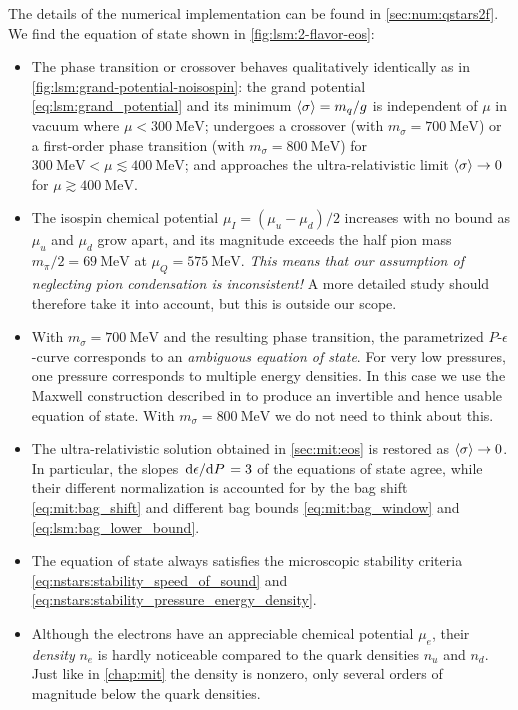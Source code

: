 \pagebreak
The details of the numerical implementation can be found in \cref{sec:num:qstars2f}.
We find the equation of state shown in \cref{fig:lsm:2-flavor-eos}:
\begin{itemize}
\item The phase transition or crossover behaves qualitatively identically as in \cref{fig:lsm:grand-potential-noisospin}:
      the grand potential \eqref{eq:lsm:grand_potential} and its minimum $\langle \sigma \rangle=m_q/g$ is independent of $\mu$ in vacuum where $\mu < \SI{300}{\mega\electronvolt}$;
      undergoes a crossover (with $m_\sigma=\SI{700}{\mega\electronvolt}$) or a first-order phase transition (with $m_\sigma=\SI{800}{\mega\electronvolt}$) for $\SI{300}{\mega\electronvolt} < \mu \lesssim \SI{400}{\mega\electronvolt}$;
      and approaches the ultra-relativistic limit $\langle \sigma \rangle\rightarrow 0$ for $\mu \gtrsim \SI{400}{\mega\electronvolt}$.
\item The isospin chemical potential $\mu_I=(\mu_u-\mu_d)/2$ increases with no bound as $\mu_u$ and $\mu_d$ grow apart,
      and its magnitude exceeds the half pion mass $m_\pi/2 = \SI{69}{\mega\electronvolt}$ at $\mu_Q = \SI{575}{\mega\electronvolt}$.
      \emph{This means that our assumption of neglecting pion condensation is inconsistent!}
      A more detailed study should therefore take it into account, but this is outside our scope.
\item With $m_\sigma=\SI{700}{\mega\electronvolt}$ and the resulting phase transition,
      the parametrized $P$-$\epsilon$-curve corresponds to an \emph{ambiguous equation of state}.
      For very low pressures, one pressure corresponds to multiple energy densities.
      In this case we use the Maxwell construction described in  to produce an invertible and hence usable equation of state.
      With $m_\sigma=\SI{800}{\mega\electronvolt}$ we do not need to think about this.
\item The ultra-relativistic solution obtained in \cref{sec:mit:eos} is restored as $\langle \sigma \rangle \rightarrow 0$.
      In particular, the slopes $\odv{\epsilon}/{P} = 3$ of the equations of state agree,
      while their different normalization is accounted for by the bag shift \eqref{eq:mit:bag_shift} and different bag bounds \eqref{eq:mit:bag_window} and \eqref{eq:lsm:bag_lower_bound}.
\item The equation of state always satisfies the microscopic stability criteria \eqref{eq:nstars:stability_speed_of_sound} and \eqref{eq:nstars:stability_pressure_energy_density}.
\item Although the electrons have an appreciable chemical potential $\mu_e$, their \emph{density} $n_e$ is hardly noticeable compared to the quark densities $n_u$ and $n_d$.
      Just like in \cref{chap:mit} the density is nonzero, only several orders of magnitude below the quark densities.
\end{itemize}


